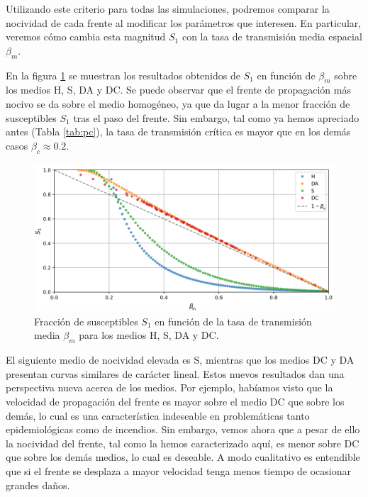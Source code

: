 Utilizando este criterio para todas las simulaciones, podremos comparar 
la nocividad de cada frente al modificar los parámetros que interesen. En particular, veremos cómo cambia esta magnitud $S_1$ con la tasa de transmisión media espacial
$\beta_m$.

En la figura \ref{fig:S_1} se muestran los resultados obtenidos de $S_1$ en función de $\beta_m$ sobre los medios H, S, DA y DC. Se puede 
observar que el frente de propagación más nocivo se da sobre el medio homogéneo, ya que da lugar a la menor fracción de susceptibles $S_1$ tras el paso del frente. Sin 
embargo, tal como ya hemos apreciado antes (Tabla \ref{tab:pc}), la tasa de transmisión crítica es mayor que en los demás casos $\beta_c\approx0.2$.

\begin{figure}[!t]
    \centering
    \includegraphics[width=\imsizeL]{S1_all.png}
    \caption{Fracción de susceptibles $S_1$ en función de la tasa de transmisión media $\beta_m$ para los medios H, S, DA y DC.}
    \label{fig:S_1}
\end{figure}

El siguiente medio de nocividad elevada es S, mientras que los medios DC y DA presentan curvas similares de carácter lineal. Estos nuevos resultados dan una perspectiva 
nueva acerca de los medios. Por ejemplo, habíamos visto que la velocidad de propagación del frente es mayor sobre el medio DC que sobre los demás, lo cual es una 
característica indeseable en problemáticas tanto epidemiológicas como de incendios. Sin embargo, vemos ahora que a pesar de ello la nocividad del frente, tal como la
hemos caracterizado aquí, es menor sobre DC que sobre los demás medios, lo cual es deseable. A modo cualitativo es entendible que si el frente se desplaza a mayor 
velocidad tenga menos tiempo de ocasionar grandes daños. 

